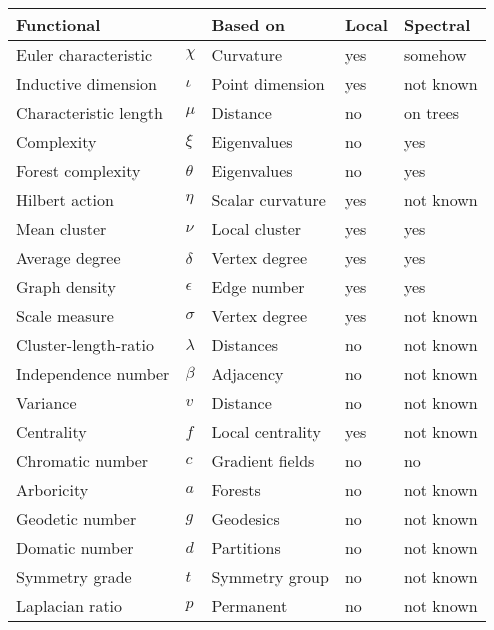 \documentclass[12pt]{amsart}
\theoremstyle{definition}
\begin{document}
\begin{center}
\begin{tabular}{|l|l|l|l|l|} \hline
Functional               &        &  Based  on          &   Local  &  Spectral         \\ \hline 
Euler characteristic     & $\chi$ &  Curvature          &   yes    &  somehow \cite{knillmckeansinger}  \\ 
Inductive dimension      & $\iota$&  Point dimension    &   yes    &  not known        \\
Characteristic length    & $\mu$  &  Distance           &   no     &  on trees \cite{GoddardOellermann}  \\ 
Complexity               & $\xi$  &  Eigenvalues        &   no     &  yes              \\ 
Forest complexity        & $\theta$ &  Eigenvalues      &   no     &  yes              \\
Hilbert action           & $\eta$ &  Scalar curvature   &   yes    &  not known        \\
Mean cluster             & $\nu$  &  Local cluster      &   yes    &  yes              \\ 
Average degree           &$\delta$&  Vertex degree      &   yes    &  yes              \\ 
Graph density            &$\epsilon$& Edge number       &   yes    &  yes              \\
Scale measure            &$\sigma$&  Vertex degree      &   yes    &  not known        \\
Cluster-length-ratio     &$\lambda$& Distances          &   no     &  not known        \\
Independence number      & $\beta$ & Adjacency          &   no     &  not known        \\
Variance                 & $v$    &  Distance           &   no     &  not known        \\
Centrality               & $f$    &  Local centrality   &   yes    &  not known        \\
Chromatic number         & $c$    &  Gradient fields    &   no     &  no \cite{Cvetkovic} \\
Arboricity               & $a$    &  Forests            &   no     &  not known        \\
Geodetic number          & $g$    &  Geodesics          &   no     &  not known        \\ 
Domatic number           & $d$    &  Partitions         &   no     &  not known        \\
Symmetry grade           & $t$    &  Symmetry group     &   no     &  not known        \\
Laplacian ratio          & $p$    &  Permanent          &   no     &  not known        \\ \hline
\end{tabular}
\end{center}
\end{document}
